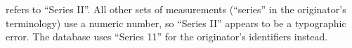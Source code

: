 \citet[p.~107]{DaviesSJ+1928+eng+JOUR} refers to ``Series II''.  All other sets
of measurements (``series'' in the originator's terminology) use a numeric
number, so ``Series II'' appears to be a typographic error.  The database uses
``Series 11'' for the originator's identifiers instead.
